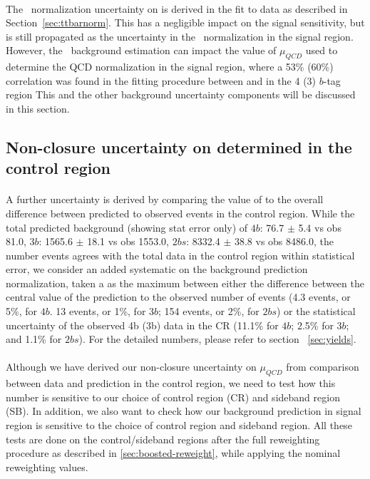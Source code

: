 \paragraph{}
The \ttbar\ normalization uncertainty on \alphatt is derived in the fit to data as described in Section~\ref{sec:ttbarnorm}. This has a negligible impact on the signal sensitivity, but is still propagated as the uncertainty in the \ttbar\ normalization in the signal region.
However, the \ttbar\ background estimation can impact the value of $\mu_{QCD}$ used to determine the QCD normalization in the signal region, where a 53\% (60\%) correlation was found in the fitting procedure between \muqcd and \alphatt in the 4 (3) $b$-tag region This and the other background uncertainty components will be discussed in this section. 

\subsection{Non-closure uncertainty on \muqcd determined in the control region}
\label{sec:non-closure-mu-qcd}

\paragraph{}
A further uncertainty is derived by comparing the value of \muqcd to the overall difference between predicted to observed events in the control region. While the total predicted background (showing stat error only) of $4b$: 76.7 $\pm$ 5.4 vs obs 81.0, $3b$: 1565.6 $\pm$ 18.1 vs obs 1553.0, $2bs$: 8332.4 $\pm$ 38.8 vs obs 8486.0, the number events agrees with the total data in the control region within statistical error, we consider an added systematic on the background prediction normalization, taken a as the maximum between either the difference between the central value of the prediction to the observed number of events (4.3 events, or 5\%, for $4b$.  13 events, or 1\%, for $3b$; 154 events, or 2\%, for $2bs$) or the statistical uncertainty of the observed 4b (3b) data in the CR (11.1\% for $4b$; 2.5\% for $3b$; and 1.1\% for $2bs$). For the detailed numbers, please refer to section ~\ref{sec:yields}. 

\paragraph{}
Although we have derived our non-closure uncertainty on $\mu_{QCD}$ from comparison between data and prediction in the control region, we need to test how this number is sensitive to our choice of control region (CR) and sideband region (SB). In addition, we also want to check how our background prediction in signal region is sensitive to the choice of control region and sideband region. All these tests are done on the control/sideband regions after the full reweighting procedure as described in \ref{sec:boosted-reweight}, while applying the nominal reweighting values.

